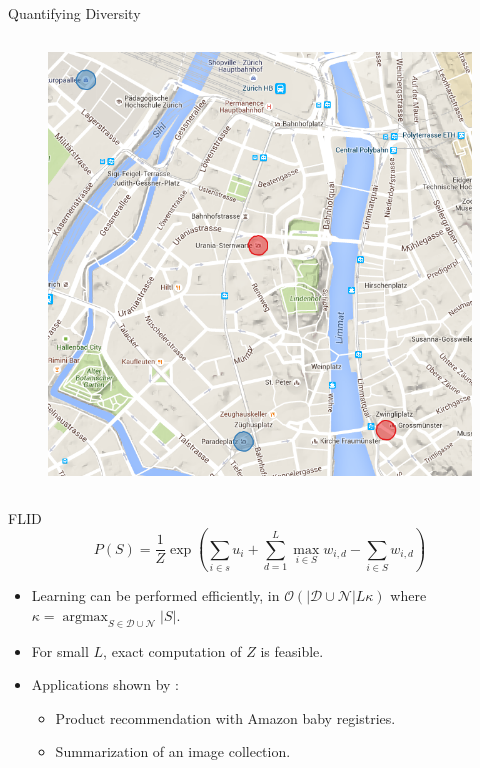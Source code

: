 \documentclass{beamer}
\DeclareMathOperator*{\argmax}{argmax}
\begin{document}
\begin{frame}{Quantifying Diversity}
\begin{columns}
\begin{column}{0.45\textwidth}
\begin{figure}
        \includegraphics[width=\textwidth]{disjoint_pairs}
      \end{figure}
    \end{column}
  \end{columns}
  
\end{frame}

\begin{frame}{FLID}
  \begin{equation*}
    P(S) = \frac{1}{Z}\exp{\left(\sum_{i \in s} u_{i} + \sum_{d=1}^{L}\max_{i \in S}{w_{i,d} - \sum_{i \in S}w_{i,d}}\right)}
  \end{equation*}
  \begin{itemize}
    \item Learning can be performed efficiently, in $\mathcal{O}(|\mathcal{D} \cup \mathcal{N}|L\kappa)$ where $\kappa = \argmax_{S \in \mathcal{D} \cup \mathcal{N}}|S|$.
    \item For small $L$, exact computation of $Z$ is feasible.
    \item Applications shown by \citet{tschiatschek16learning}:
      \begin{itemize}
        \item Product recommendation with Amazon baby registries.
        \item Summarization of an image collection.
      \end{itemize}
  \end{itemize}
\end{frame}
\end{document}
